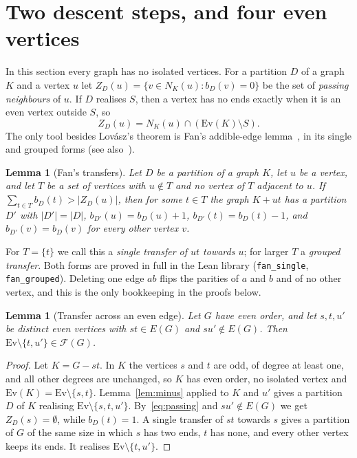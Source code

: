 \documentclass[11pt]{amsart}
\newtheorem{lemma}[theorem]{Lemma}
\theoremstyle{definition}
\newcommand{\cF}{\mathcal F}
\newcommand{\Ev}{\mathrm{Ev}}
\begin{document}
\section{Two descent steps, and four even vertices}\label{sec:four}

In this section every graph has no isolated vertices. For a partition $D$ of a graph $K$ and a
vertex $u$ let $Z_D(u)=\{v\in N_K(u): b_D(v)=0\}$ be the set of \emph{passing neighbours} of $u$.
If $D$ realises $S$, then a vertex has no ends exactly when it is an even vertex outside $S$, so
\begin{equation}\label{eq:passing}
Z_D(u)=N_K(u)\cap(\Ev(K)\setminus S).
\end{equation}
The only tool besides Lov\'asz's theorem is Fan's addible-edge lemma~\cite{Fan}, in its single and
grouped forms (see also~\cite[Lemmas~6 and~7]{BS}).

\begin{lemma}[Fan's transfers]\label{lem:fan}
Let $D$ be a partition of a graph $K$, let $u$ be a vertex, and let $T$ be a set of vertices with
$u\notin T$ and no vertex of $T$ adjacent to $u$. If $\sum_{t\in T}b_D(t)>|Z_D(u)|$, then for some
$t\in T$ the graph $K+ut$ has a partition $D'$ with $|D'|=|D|$, $b_{D'}(u)=b_D(u)+1$,
$b_{D'}(t)=b_D(t)-1$, and $b_{D'}(v)=b_D(v)$ for every other vertex $v$.
\end{lemma}

For $T=\{t\}$ we call this a \emph{single transfer of $ut$ towards $u$}; for larger $T$ a
\emph{grouped transfer}. Both forms are proved in full in the Lean library (\texttt{fan\_single},
\texttt{fan\_grouped}). Deleting one edge $ab$ flips the parities of $a$ and $b$ and of no other
vertex, and this is the only bookkeeping in the proofs below.

\begin{lemma}[Transfer across an even edge]\label{lem:edge}
Let $G$ have even order, and let $s,t,u'$ be distinct even vertices with $st\in E(G)$ and
$su'\notin E(G)$. Then $\Ev\setminus\{t,u'\}\in\cF(G)$.
\end{lemma}

\begin{proof}
Let $K=G-st$. In $K$ the vertices $s$ and $t$ are odd, of degree at least one, and all other
degrees are unchanged, so $K$ has even order, no isolated vertex and $\Ev(K)=\Ev\setminus\{s,t\}$.
Lemma~\ref{lem:minus} applied to $K$ and $u'$ gives a partition $D$ of $K$ realising
$\Ev\setminus\{s,t,u'\}$. By~\eqref{eq:passing} and $su'\notin E(G)$ we get $Z_D(s)=\emptyset$, while
$b_D(t)=1$. A single transfer of $st$ towards $s$ gives a partition of $G$ of the same size in which
$s$ has two ends, $t$ has none, and every other vertex keeps its ends. It realises
$\Ev\setminus\{t,u'\}$.
\end{proof}
\end{document}
